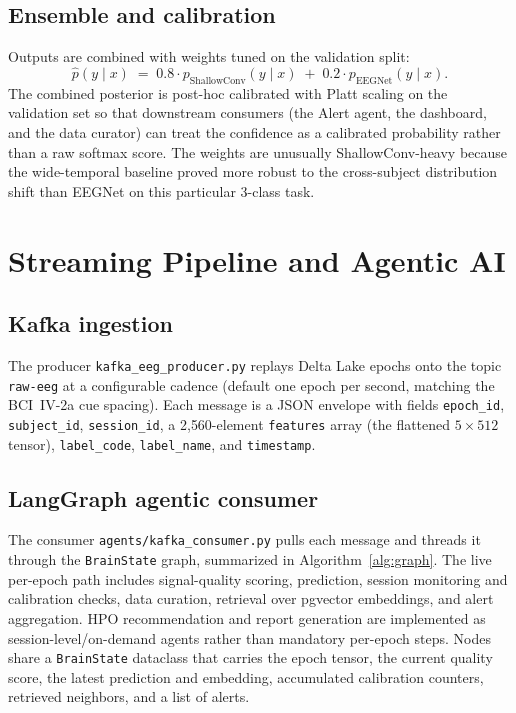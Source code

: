 \documentclass[conference]{IEEEtran}
\begin{document}
\subsection{Ensemble and calibration}

Outputs are combined with weights tuned on the validation split:
\begin{equation}
\hat{p}(y \mid x) \;=\; 0.8 \cdot p_\text{ShallowConv}(y \mid x)
                     \;+\; 0.2 \cdot p_\text{EEGNet}(y \mid x).
\end{equation}
The combined posterior is post-hoc calibrated with Platt scaling on the
validation set so that downstream consumers (the Alert agent, the
dashboard, and the data curator) can treat the confidence as a calibrated
probability rather than a raw softmax score. The weights are unusually
ShallowConv-heavy because the wide-temporal baseline proved more robust
to the cross-subject distribution shift than EEGNet on this particular
3-class task.

\section{Streaming Pipeline and Agentic AI}
\label{sec:stream}

\subsection{Kafka ingestion}

The producer \texttt{kafka\_eeg\_producer.py} replays Delta Lake epochs onto
the topic \texttt{raw-eeg} at a configurable cadence (default one epoch per
second, matching the BCI~IV-2a cue spacing). Each message is a JSON envelope
with fields \texttt{epoch\_id}, \texttt{subject\_id}, \texttt{session\_id}, a
2{,}560-element \texttt{features} array (the flattened $5 \times 512$
tensor), \texttt{label\_code}, \texttt{label\_name}, and \texttt{timestamp}.

\subsection{LangGraph agentic consumer}

The consumer \texttt{agents/kafka\_consumer.py} pulls each message and
threads it through the \texttt{BrainState} graph, summarized in
Algorithm~\ref{alg:graph}. The live per-epoch path includes signal-quality
scoring, prediction, session monitoring and calibration checks, data curation,
retrieval over pgvector embeddings, and alert aggregation. HPO recommendation
and report generation are implemented as session-level/on-demand agents rather
than mandatory per-epoch steps. Nodes share a \texttt{BrainState} dataclass
that carries the epoch tensor, the current quality score, the latest prediction
and embedding, accumulated calibration counters, retrieved neighbors, and a
list of alerts.
\end{document}
